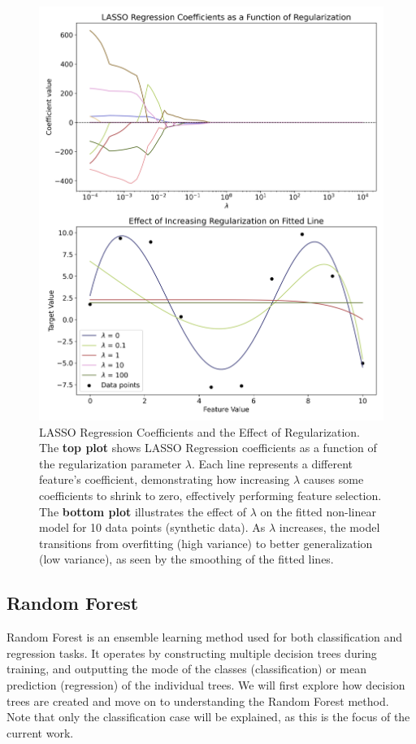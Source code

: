 \documentclass[english,11pt,a4paper,titlepage]{article}
\begin{document}
	\begin{figure}[!t]
		\centering
		\includegraphics[width=1.0\linewidth]{img/lasso_lambda_effect}
		\caption{LASSO Regression Coefficients and the Effect of Regularization. \\ The \textbf{top plot} shows LASSO Regression coefficients as a function of the regularization parameter $\lambda$. Each line represents a different feature's coefficient, demonstrating how increasing $\lambda$ causes some coefficients to shrink to zero, effectively performing feature selection. The \textbf{bottom plot} illustrates the effect of $\lambda$ on the fitted non-linear model for 10 data points (synthetic data). As $\lambda$ increases, the model transitions from overfitting (high variance) to better generalization (low variance), as seen by the smoothing of the fitted lines.}
		\label{fig:lassolambdaeffect}
	\end{figure}
	
	\clearpage
	
	\subsection*{Random Forest}
	Random Forest is an ensemble learning method used for both classification and regression tasks. It operates by constructing multiple decision trees during training, and outputting the mode of the classes (classification) or mean prediction (regression) of the individual trees. We will first explore how decision trees are created and move on to understanding the Random Forest method. Note that only the classification case will be explained, as this is the focus of the current work.
	
\end{document}
